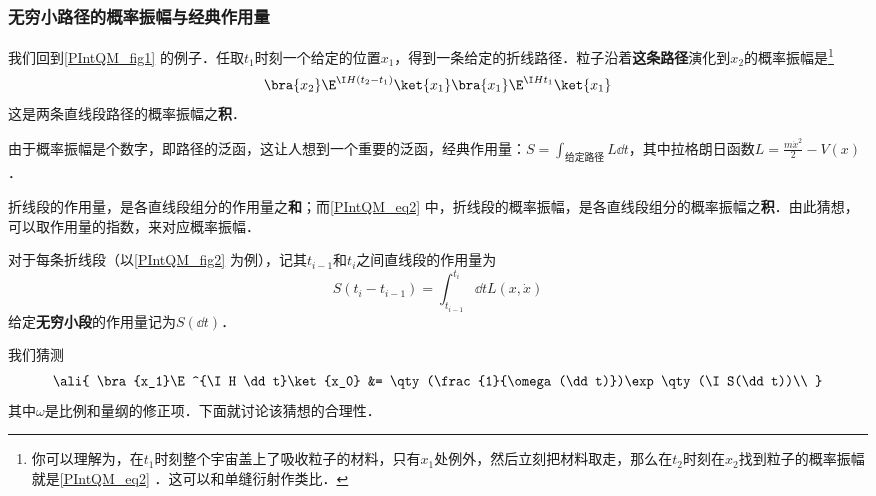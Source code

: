 \subsubsection{无穷小路径的概率振幅与经典作用量}

我们回到\autoref{PIntQM_fig1} 的例子．任取$t_1$时刻一个给定的位置$x_1$，得到一条给定的折线路径．粒子沿着\textbf{这条路径}演化到$x_2$的概率振幅是\footnote{你可以理解为，在$t_1$时刻整个宇宙盖上了吸收粒子的材料，只有$x_1$处例外，然后立刻把材料取走，那么在$t_2$时刻在$x_2$找到粒子的概率振幅就是\autoref{PIntQM_eq2} ．这可以和单缝衍射作类比．}
\begin{equation}\label{PIntQM_eq2}
\bra{x_2}\E^{\I H (t_2-t_1)}\ket{x_1}\bra{x_1}\E^{\I H t_1}\ket{x_1}
\end{equation}
这是两条直线段路径的概率振幅之\textbf{积}．



由于概率振幅是个数字，即路径的泛函，这让人想到一个重要的泛函，经典作用量：$S=\int_{\text{给定路径}}L\dd t$，其中拉格朗日函数$L=\frac{m\dot{x}^2}{2}-V(x)$．

折线段的作用量，是各直线段组分的作用量之\textbf{和}；而\autoref{PIntQM_eq2} 中，折线段的概率振幅，是各直线段组分的概率振幅之\textbf{积}．由此猜想，可以取作用量的指数，来对应概率振幅．

对于每条折线段（以\autoref{PIntQM_fig2} 为例），记其$t_{i-1}$和$t_i$之间直线段的作用量为
\begin{equation}
S(t_{i}-t_{i-1})=\int^{t_i}_{t_{i-1}}\dd t L(x, \dot{x})
\end{equation}
给定\textbf{无穷小段}的作用量记为$S(\dd t)$．

我们猜测
\begin{equation}
\ali{
    \bra{x_1}\E^{\I H \dd t}\ket{x_0} &= \qty(\frac{1}{\omega(\dd t)})\exp\qty(\I S(\dd t))\\
}
\end{equation}
其中$\omega$是比例和量纲的修正项．下面就讨论该猜想的合理性．

